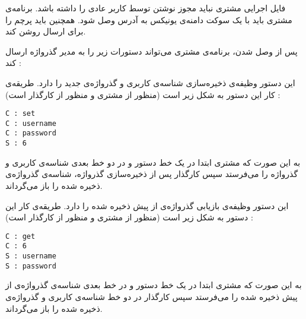  فایل اجرایی مشتری نباید مجوز نوشتن توسط کاربر عادی را داشته باشد.
 برنامه‌ی مشتری باید با یک سوکت دامنه‌ی یونیکس به آدرس  وصل شود. همچنین باید پرچم  را برای ارسال  روشن کند.

پس از وصل شدن، برنامه‌ی مشتری می‌تواند دستورات زیر را به مدیر گذرواژه ارسال کند :


این دستور وظیفه‌ی ذخیره‌سازی شناسه‌ی کاربری و گذرواژه‌ی جدید را دارد. طریقه‌ی کار این دستور به شکل زیر است (منظور از  مشتری و منظور از  کارگذار است) : 

\lstset{basicstyle=\footnotesize\ttfamily,breaklines=true}
\begin{latin}
\begin{lstlisting}
C : set
C : username
C : password
S : 6
\end{lstlisting}
\end{latin}

به این صورت که مشتری ابتدا در یک خط دستور  و در دو خط بعدی شناسه‌ی کاربری و گذرواژه را می‌فرستد سپس کارگذار پس از ذخیره‌سازی گذرواژه، شناسه‌ی گذرواژه‌ی ذخیره شده را باز می‌گرداند.


این دستور وظیفه‌ی بازیابی گذرواژه‌ی از پیش ذخیره شده را دارد. طریقه‌ی کار این دستور به شکل زیر است (منظور از  مشتری و منظور از  کارگذار است) : 

\lstset{basicstyle=\footnotesize\ttfamily,breaklines=true}
\begin{latin}
\begin{lstlisting}
C : get
C : 6
S : username
S : password
\end{lstlisting}
\end{latin}

به این صورت که مشتری ابتدا در یک خط دستور  و در خط بعدی شناسه‌ی گذرواژه‌ی از پیش ذخیره شده را می‌فرستد سپس کارگذار در دو خط شناسه‌ی کاربری و گذرواژه‌ی ذخیره‌ شده را باز می‌گرداند.

